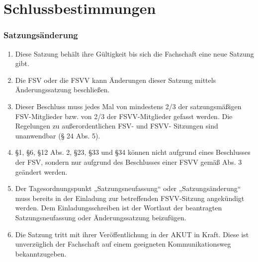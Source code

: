 \documentclass{article}
\begin{document}
\part{Schlussbestimmungen}\label{d.-schlussbestimmungen}

\section{Satzungsänderung}\label{satzungsuxe4nderung}

\begin{enumerate}[(1)]
	\item Diese Satzung behält ihre Gültigkeit bis sich die Fachschaft eine neue Satzung gibt.
	\item Die FSV oder die FSVV kann Änderungen dieser Satzung mittels Änderungssatzung beschließen.
	\item Dieser Beschluss muss jedes Mal von mindestens 2/3 der satzungsmäßigen FSV-Mitglieder bzw. von 2/3 der FSVV-Mitglieder gefasst werden. Die Regelungen zu außerordentlichen FSV- und FSVV- Sitzungen sind unanwendbar (§ 24 Abs. 5).
	\item §1, §6, §12 Abs. 2, §23, §33 und §34 können nicht aufgrund eines Beschlusses der FSV, sondern nur aufgrund des Beschlusses einer FSVV gemäß Abs. 3 geändert werden.
	\item Der Tagesordnungspunkt „Satzungsneufassung`` oder „Satzungsänderung`` muss bereits in der Einladung zur betreffenden FSVV-Sitzung angekündigt werden. Dem Einladungsschreiben ist der Wortlaut der beantragten Satzungsneufassung oder Änderungssatzung beizufügen.
	\item Die Satzung tritt mit ihrer Veröffentlichung in der AKUT in Kraft. Diese ist unverzüglich der Fachschaft auf einem geeigneten Kommunikationsweg bekanntzugeben.
\end{enumerate}
\end{document}
